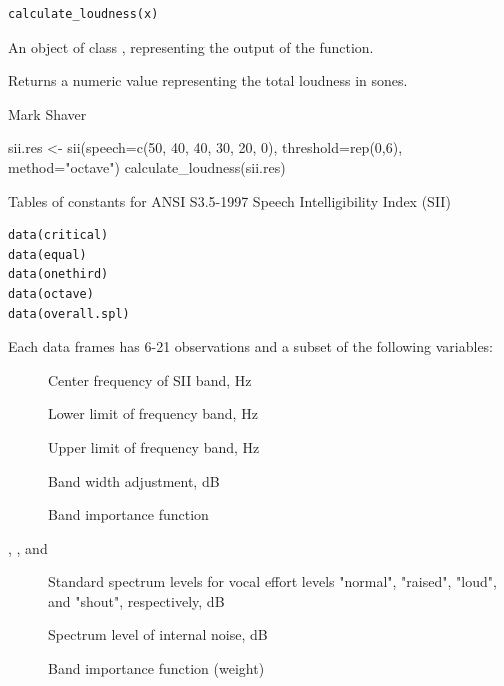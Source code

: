 \documentclass[letterpaper]{book}
\begin{document}
%
\begin{Usage}
\begin{verbatim}
calculate_loudness(x)
\end{verbatim}
\end{Usage}
%
\begin{Arguments}
\begin{ldescription}
\item[\code{x}] An object of class , representing the output of the  function.
\end{ldescription}
\end{Arguments}
%
\begin{Value}
Returns a numeric value representing the total loudness in sones.
\end{Value}
%
\begin{Author}
Mark Shaver
\end{Author}
%
\begin{Examples}
\begin{ExampleCode}
sii.res <- sii(speech=c(50, 40, 40, 30, 20, 0), threshold=rep(0,6), method="octave")
calculate_loudness(sii.res)
\end{ExampleCode}
\end{Examples}
%
\begin{Description}
Tables of constants for ANSI S3.5-1997 Speech Intelligibility Index
(SII) 
\end{Description}
%
\begin{Usage}
\begin{verbatim}
data(critical)
data(equal)
data(onethird)
data(octave)
data(overall.spl)
\end{verbatim}
\end{Usage}
%
\begin{Format}
Each data frames has 6-21 observations and a subset of the following
variables: 
\begin{description}

\item[] Center frequency of SII band, Hz
\item[] Lower limit of frequency band, Hz
\item[] Upper limit of frequency band, Hz
\item[] Band width adjustment, dB
\item[] Band importance function
\item[, ,  and
] Standard spectrum levels for vocal effort levels
"normal", "raised", "loud", and "shout", respectively, dB
\item[] Spectrum level of internal noise, dB
\item[] Band importance function (weight)

\end{description}

\end{Format}
\end{document}
